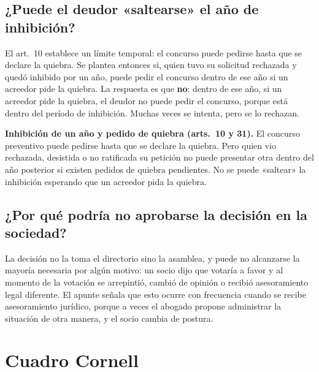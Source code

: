 \documentclass[12pt,oneside]{book}
\begin{document}
\subsection{¿Puede el deudor «saltearse» el año de inhibición?}

El art.~10 establece un límite temporal: el concurso puede pedirse hasta que se declare la quiebra. Se plantea entonces si, quien tuvo su solicitud rechazada y quedó inhibido por un año, puede pedir el concurso dentro de ese año si un acreedor pide la quiebra. La respuesta es que \textbf{no}: dentro de ese año, si un acreedor pide la quiebra, el deudor no puede pedir el concurso, porque está dentro del período de inhibición. Muchas veces se intenta, pero se lo rechazan.

\begin{important}
\textbf{Inhibición de un año y pedido de quiebra (arts.~10 y 31).} El concurso preventivo puede pedirse hasta que se declare la quiebra. Pero quien vio rechazada, desistida o no ratificada su petición no puede presentar otra dentro del año posterior si existen pedidos de quiebra pendientes. No se puede «saltear» la inhibición esperando que un acreedor pida la quiebra.
\end{important}

\subsection{¿Por qué podría no aprobarse la decisión en la sociedad?}

La decisión no la toma el directorio sino la asamblea, y puede no alcanzarse la mayoría necesaria por algún motivo: un socio dijo que votaría a favor y al momento de la votación se arrepintió, cambió de opinión o recibió asesoramiento legal diferente. El apunte señala que esto ocurre con frecuencia cuando se recibe asesoramiento jurídico, porque a veces el abogado propone administrar la situación de otra manera, y el socio cambia de postura.

\section{Cuadro Cornell}
\end{document}
